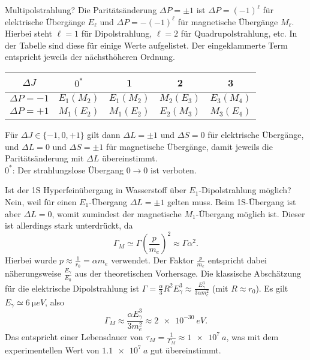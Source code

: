 \begin{fquestion}{Multipolstrahlung?}
    Die Paritätsänderung $\Delta P = \pm 1$ ist $\Delta P = (-1)^{\ell}$ für elektrische Übergänge $E_\ell$ und $\Delta P = -(-1)^{\ell}$ für magnetische Übergänge $M_\ell$.
    Hierbei steht $\ell = 1$ für Dipolstrahlung, $\ell = 2$ für Quadrupolstrahlung, etc.
    In der Tabelle sind diese für einige Werte aufgelistet.
    Der eingeklammerte Term entspricht jeweils der nächsthöheren Ordnung. 
    \begin{center}
    \begin{tabular}{c|c|c|c|c}
        $\Delta J$ & $0^\ast$ & 1 & 2 & 3 \\ \hline
        $\Delta P = -1$ & $E_1 (M_2)$ & $E_1 (M_2)$ & $M_2 (E_3)$ & $E_3 (M_4)$ \\
        $\Delta P = +1$ & $M_1 (E_2)$ & $M_1 (E_2)$ & $E_2 (M_3)$ & $M_3 (E_4)$ \\
    \end{tabular}
    \end{center}
    Für $\Delta J \in \{-1,0,+1\}$ gilt dann $\Delta L = \pm 1$ und $\Delta S = 0$ für elektrische Übergänge, und $\Delta L = 0$ und $\Delta S = \pm 1$ für magnetische Übergänge, damit jeweils die Paritätsänderung mit $\Delta L$ übereinstimmt.
    \\
    $0^\ast$: Der strahlungslose Übergang $0\rightarrow 0$ ist verboten.
\end{fquestion}

\begin{fquestion}{Ist der 1S Hyperfeinübergang in Wasserstoff über $E_1$-Dipolstrahlung möglich?}
    Nein, weil für einen $E_1$-Übergang $\Delta L = \pm 1$ gelten muss.
    Beim 1S-Übergang ist aber $\Delta L = 0$, womit zumindest der magnetische $M_1$-Übergang möglich ist.
    Dieser ist allerdings stark unterdrückt, da
    $$\Gamma_M \simeq \Gamma \left(\frac{p}{m_e}\right)^2 \approx \Gamma\alpha^2.$$
    Hierbei wurde $p\approx\frac{1}{r_0} = \alpha m_e$ verwendet.
    Der Faktor $\frac{p}{m_e}$ entspricht dabei näherungsweise $\frac{E_\gamma }{E_0}$ aus der theoretischen Vorhersage.
    Die klassische Abschätzung für die elektrische Dipolstrahlung ist $\Gamma = \frac{\alpha}{3} R^2E_\gamma^3 \approx \frac{E_\gamma^3}{3\alpha m_e^2}$ (mit $R\approx r_0$).
    Es gilt $E_\gamma \simeq \SI{6}{\micro eV}$, also
    $$\Gamma_M \approx \frac{\alpha E_\gamma^3}{3m_e^2} \approx \SI{2e-30}{eV}.$$
    Das entspricht einer Lebensdauer von $\tau_M = \frac{1}{\Gamma_M} \approx \SI{1e7}{a}$, was mit dem experimentellen Wert von $\SI{1.1e7}{a}$ gut übereinstimmt.
\end{fquestion}

